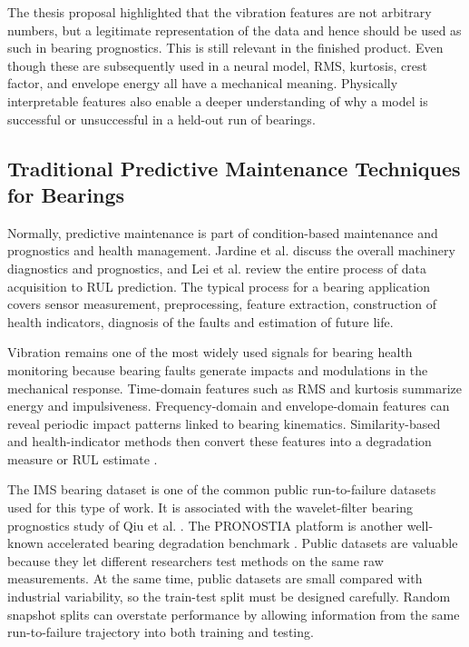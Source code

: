The thesis proposal highlighted that the vibration features are not arbitrary numbers, but a legitimate representation of the data and hence should be used as such in bearing prognostics. This is still relevant in the finished product. Even though these are subsequently used in a neural model, RMS, kurtosis, crest factor, and envelope energy all have a mechanical meaning. Physically interpretable features also enable a deeper understanding of why a model is successful or unsuccessful in a held-out run of bearings.

\subsection{Traditional Predictive Maintenance Techniques for Bearings}

Normally, predictive maintenance is part of condition-based maintenance and prognostics and health management. Jardine et al. \cite{jardine2006} discuss the overall machinery diagnostics and prognostics, and Lei et al. \cite{lei2018} review the entire process of data acquisition to RUL prediction. The typical process for a bearing application covers sensor measurement, preprocessing, feature extraction, construction of health indicators, diagnosis of the faults and estimation of future life.

Vibration remains one of the most widely used signals for bearing health monitoring because bearing faults generate impacts and modulations in the mechanical response. Time-domain features such as RMS and kurtosis summarize energy and impulsiveness. Frequency-domain and envelope-domain features can reveal periodic impact patterns linked to bearing kinematics. Similarity-based and health-indicator methods then convert these features into a degradation measure or RUL estimate \cite{huang2020}.

The IMS bearing dataset is one of the common public run-to-failure datasets used for this type of work. It is associated with the wavelet-filter bearing prognostics study of Qiu et al. \cite{qiu2006}. The PRONOSTIA platform is another well-known accelerated bearing degradation benchmark \cite{nectoux2012}. Public datasets are valuable because they let different researchers test methods on the same raw measurements. At the same time, public datasets are small compared with industrial variability, so the train-test split must be designed carefully. Random snapshot splits can overstate performance by allowing information from the same run-to-failure trajectory into both training and testing.

